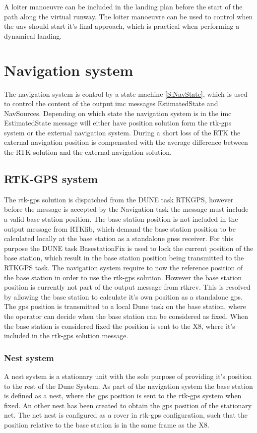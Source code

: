 A loiter manoeuvre can be included in the landing plan before the start of the path along the virtual runway. The loiter manoeuvre can be used to control when the \gls{uav} should start it's final approach, which is practical when performing a dynamical landing.
\section{Navigation system}
The navigation system is control by a state machine \ref{S:NavState}, which is used to control the content of the output \gls{imc} messages EstimatedState and NavSources. Depending on which state the navigation system is in the \gls{imc} EstimatedState message will either have position solution form the \gls{rtk-gps} system or the external navigation system. During a short loss of the RTK the external navigation position is compensated with the average difference between the RTK solution and the external navigation solution.
\subsection{RTK-GPS system}
The \gls{rtk-gps} solution is dispatched from the DUNE task RTKGPS, however before the message is accepted by the Navigation task the message must include a valid base station position. The base station position is not included in the output message from RTKlib, which demand the base station position to be calculated locally at the base station as a standalone \gls{gnss} receiver. For this purpose the DUNE task BasestationFix is used to lock the current position of the base station, which result in the base station position being transmitted to the RTKGPS task.
The navigation system require to now the reference position of the base station in order to use the \gls{rtk-gps} solution. However the base station position is currently not part of the output message from rtkrcv. This is resolved by allowing the base station to calculate it's own position as a standalone \gls{gps}. The \gls{gps} position is transmitted to a local Dune task on the base station, where the operator can decide when the base station can be considered as fixed. When the base station is considered fixed the position is sent to the X8, where it's included in the \gls{rtk-gps} solution message.
\subsubsection{Nest system}
A nest system is a stationary unit with the sole purpose of providing it's position to the rest of the Dune System. As part of the navigation system the base station is defined as a nest, where the \gls{gps} position is sent to the \gls{rtk-gps} system when fixed.
An other nest has been created to obtain the \gls{gps} position of the stationary net. The net nest is configured as a rover in \gls{rtk-gps} configuration, such that the position relative to the base station is in the same frame as the X8.
